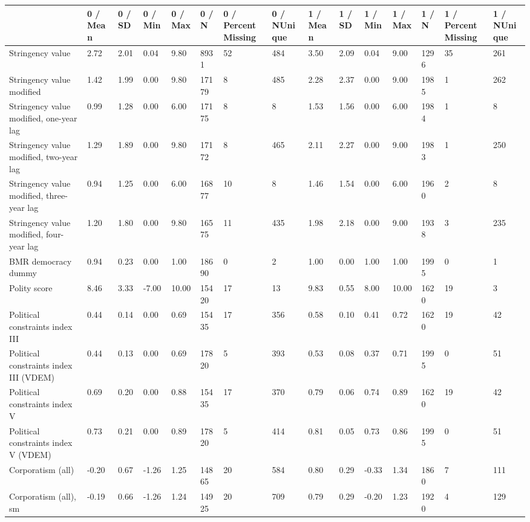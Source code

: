 
\begin{longtable}{lllllllllllllll}
\toprule
  & 0 / Mean & 0 / SD & 0 / Min & 0 / Max & 0 / N & 0 / PercentMissing & 0 / NUnique & 1 / Mean & 1 / SD & 1 / Min & 1 / Max & 1 / N & 1 / PercentMissing & 1 / NUnique\\
\midrule
Stringency value & 2.72 & 2.01 & 0.04 & 9.80 & 8931 & 52 & 484 & 3.50 & 2.09 & 0.04 & 9.00 & 1296 & 35 & 261\\
Stringency value modified & 1.42 & 1.99 & 0.00 & 9.80 & 17179 & 8 & 485 & 2.28 & 2.37 & 0.00 & 9.00 & 1985 & 1 & 262\\
Stringency value modified, one-year lag & 0.99 & 1.28 & 0.00 & 6.00 & 17175 & 8 & 8 & 1.53 & 1.56 & 0.00 & 6.00 & 1984 & 1 & 8\\
Stringency value modified, two-year lag & 1.29 & 1.89 & 0.00 & 9.80 & 17172 & 8 & 465 & 2.11 & 2.27 & 0.00 & 9.00 & 1983 & 1 & 250\\
Stringency value modified, three-year lag & 0.94 & 1.25 & 0.00 & 6.00 & 16877 & 10 & 8 & 1.46 & 1.54 & 0.00 & 6.00 & 1960 & 2 & 8\\
\addlinespace
Stringency value modified, four-year lag & 1.20 & 1.80 & 0.00 & 9.80 & 16575 & 11 & 435 & 1.98 & 2.18 & 0.00 & 9.00 & 1938 & 3 & 235\\
BMR democracy dummy & 0.94 & 0.23 & 0.00 & 1.00 & 18690 & 0 & 2 & 1.00 & 0.00 & 1.00 & 1.00 & 1995 & 0 & 1\\
Polity score & 8.46 & 3.33 & -7.00 & 10.00 & 15420 & 17 & 13 & 9.83 & 0.55 & 8.00 & 10.00 & 1620 & 19 & 3\\
Political constraints index III & 0.44 & 0.14 & 0.00 & 0.69 & 15435 & 17 & 356 & 0.58 & 0.10 & 0.41 & 0.72 & 1620 & 19 & 42\\
Political constraints index III (VDEM) & 0.44 & 0.13 & 0.00 & 0.69 & 17820 & 5 & 393 & 0.53 & 0.08 & 0.37 & 0.71 & 1995 & 0 & 51\\
\addlinespace
Political constraints index V & 0.69 & 0.20 & 0.00 & 0.88 & 15435 & 17 & 370 & 0.79 & 0.06 & 0.74 & 0.89 & 1620 & 19 & 42\\
Political constraints index V (VDEM) & 0.73 & 0.21 & 0.00 & 0.89 & 17820 & 5 & 414 & 0.81 & 0.05 & 0.73 & 0.86 & 1995 & 0 & 51\\
Corporatism (all) & -0.20 & 0.67 & -1.26 & 1.25 & 14865 & 20 & 584 & 0.80 & 0.29 & -0.33 & 1.34 & 1860 & 7 & 111\\
Corporatism (all), sm & -0.19 & 0.66 & -1.26 & 1.24 & 14925 & 20 & 709 & 0.79 & 0.29 & -0.20 & 1.23 & 1920 & 4 & 129\\

\end{longtable}
